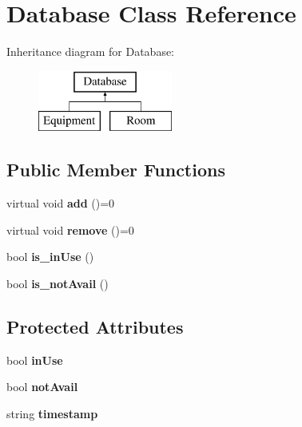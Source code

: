 \hypertarget{class_database}{}\section{Database Class Reference}
\label{class_database}
Inheritance diagram for Database\+:\begin{figure}[H]
\begin{center}
\leavevmode
\includegraphics[height=2.000000cm]{class_database}
\end{center}
\end{figure}
\subsection*{Public Member Functions}
\begin{DoxyCompactItemize}
\item 
\mbox{\label{class_database_af8eae4e47965e425afd92992ef6502eb}} 
virtual void {\bfseries add} ()=0
\item 
\mbox{\label{class_database_af56afcc7b25e6e72b500a51bfe5fbba8}} 
virtual void {\bfseries remove} ()=0
\item 
\mbox{\label{class_database_a260341c4a0f82d846f766b1718372eca}} 
bool {\bfseries is\+\_\+in\+Use} ()
\item 
\mbox{\label{class_database_a339260d3319b3e385341e8950fd52d18}} 
bool {\bfseries is\+\_\+not\+Avail} ()
\end{DoxyCompactItemize}
\subsection*{Protected Attributes}
\begin{DoxyCompactItemize}
\item 
\mbox{\label{class_database_abe3bd4bc76e3a9a78ffc9ab1cf2d313a}} 
bool {\bfseries in\+Use}
\item 
\mbox{\label{class_database_aa603cdef357e7c119ebbcb31f3d23c81}} 
bool {\bfseries not\+Avail}
\item 
\mbox{\label{class_database_a99264fc3ee90a65147d4a2919346ff16}} 
string {\bfseries timestamp}
\end{DoxyCompactItemize}


